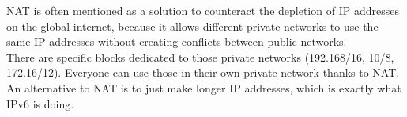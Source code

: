 NAT is often mentioned as a solution to counteract the depletion of IP addresses on the global internet, because it allows different private networks to use the same IP addresses without creating conflicts between public networks. \\
There are specific blocks dedicated to those private networks (192.168/16, 10/8, 172.16/12). Everyone can use those in their own private network thanks to NAT. \\

An alternative to NAT is to just make longer IP addresses, which is exactly what IPv6 is doing.

